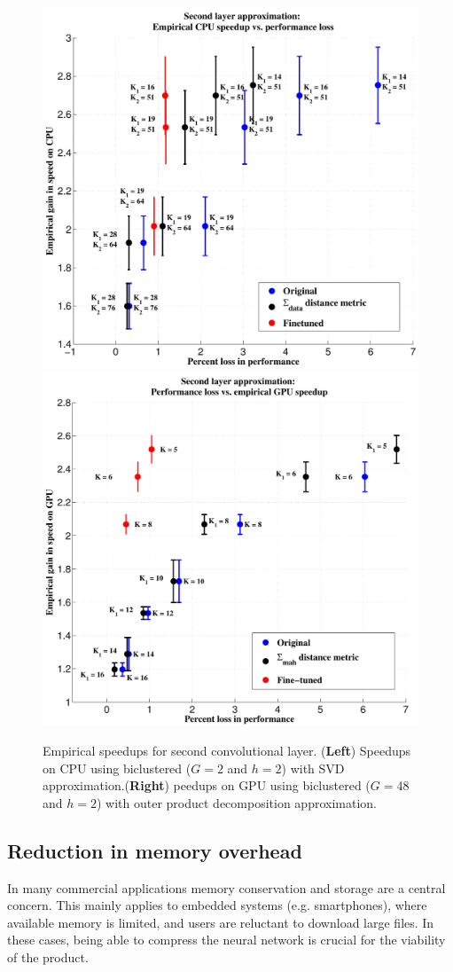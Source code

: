 \begin{figure}[t]
\centering
\begin{minipage}{0.75\textwidth}
      \includegraphics[width=0.5\linewidth]{img/layer2_CPUspeedup_vs_performance_loss_finetune_and_orig.pdf}
      \quad\quad
      \includegraphics[width=0.5\linewidth]{img/layer2_GPUspeedup_vs_performance_loss_finetune_and_orig.pdf}
\end{minipage}
\caption{Empirical speedups for second convolutional layer. ({\bf Left}) Speedups on CPU using biclustered ($G = 2$ and $h = 2$) with SVD approximation.({\bf Right}) peedups on GPU using biclustered ($G = 48$ and $h = 2$) with outer product decomposition approximation.}
\label{fig:biclust_speedups}
\end{figure}


\subsection{Reduction in memory overhead}
In many commercial applications memory conservation and storage are a
central concern. This mainly applies to embedded systems
(e.g. smartphones), where available memory is limited, and users are
reluctant to download large files. In these cases, being able to
compress the neural network is crucial for the viability of the
product. 

